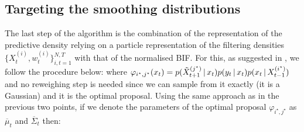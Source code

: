 \subsection{Targeting the smoothing distributions}
The last step of the algorithm is the combination of the representation of the predictive density relying on a particle representation of the filtering densities $\{X^{(i)}_{t}, w^{(i)}_{t}\}_{i,t=1}^{N,T}$ with that of the normalised BIF. For this, as suggested in \citet{fearnhead10}, we follow the procedure below:
%
%
where $\varphi_{i^{\star},j^{\star}}(x_{t}) = p(\tilde X^{(j^{\star})}_{t+1}\,|\, x_{t})p(y_{t}\,|\, x_t)p(x_{t}\,|\, X^{(i^{\star})}_{t-1})$ and no reweighing step is needed since we can sample from it exactly (it is a Gaussian) and it is the optimal proposal. Using the same approach as in the previous two points, if we denote the parameters of the optimal proposal $\varphi_{i^{\star},j^{\star}}$ as $\overline \mu_{t}$ and $\overline \Sigma_{t}$ then:
%
%











